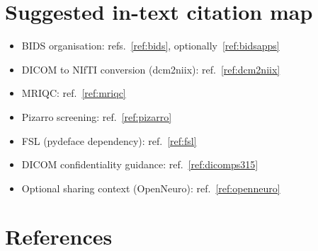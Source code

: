 \documentclass[11pt,letterpaper]{article}
\begin{document}
\section{Suggested in-text citation map}

\begin{itemize}[leftmargin=*]
  \item BIDS organisation: refs.~\ref{ref:bids}, optionally~\ref{ref:bidsapps}
  \item DICOM to NIfTI conversion (dcm2niix): ref.~\ref{ref:dcm2niix}
  \item MRIQC: ref.~\ref{ref:mriqc}
  \item Pizarro screening: ref.~\ref{ref:pizarro}
  \item FSL (pydeface dependency): ref.~\ref{ref:fsl}
  \item DICOM confidentiality guidance: ref.~\ref{ref:dicomps315}
  \item Optional sharing context (OpenNeuro): ref.~\ref{ref:openneuro}
\end{itemize}

\section{References}
\label{sec:refs}
\end{document}
